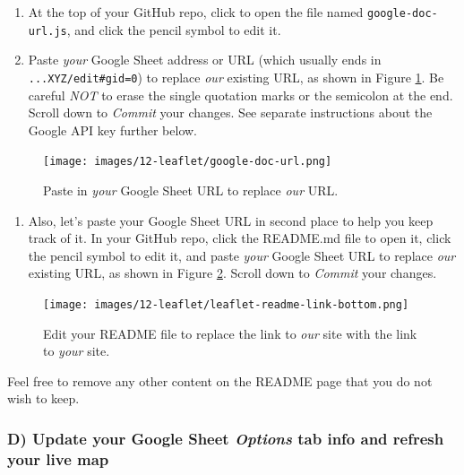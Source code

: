 \documentclass[
  english,
]{book}
\providecommand{\tightlist}{%
  \setlength{\itemsep}{0pt}\setlength{\parskip}{0pt}}
\begin{document}
\begin{enumerate}
\def\labelenumi{\arabic{enumi}.}
\item
  At the top of your GitHub repo, click to open the file named \texttt{google-doc-url.js}, and click the pencil symbol to edit it.
\item
  Paste \emph{your} Google Sheet address or URL (which usually ends in \texttt{...XYZ/edit\#gid=0}) to replace \emph{our} existing URL, as shown in Figure \ref{fig:google-doc-url}. Be careful \emph{NOT} to erase the single quotation marks or the semicolon at the end. Scroll down to \emph{Commit} your changes. See separate instructions about the Google API key further below.
\end{enumerate}



\begin{figure}
\centering
\texttt{[image: images/12-leaflet/google-doc-url.png]}
\caption{\label{fig:google-doc-url}Paste in \emph{your} Google Sheet URL to replace \emph{our} URL.}
\end{figure}

\begin{enumerate}
\def\labelenumi{\arabic{enumi}.}
\setcounter{enumi}{2}
\tightlist
\item
  Also, let's paste your Google Sheet URL in second place to help you keep track of it. In your GitHub repo, click the README.md file to open it, click the pencil symbol to edit it, and paste \emph{your} Google Sheet URL to replace \emph{our} existing URL, as shown in Figure \ref{fig:leaflet-readme-link-bottom}. Scroll down to \emph{Commit} your changes.
\end{enumerate}



\begin{figure}
\centering
\texttt{[image: images/12-leaflet/leaflet-readme-link-bottom.png]}
\caption{\label{fig:leaflet-readme-link-bottom}Edit your README file to replace the link to \emph{our} site with the link to \emph{your} site.}
\end{figure}

Feel free to remove any other content on the README page that you do not wish to keep.

\hypertarget{d-update-your-google-sheet-options-tab-info-and-refresh-your-live-map}{%
\subsubsection*{\texorpdfstring{D) Update your Google Sheet \emph{Options} tab info and refresh your live map}{D) Update your Google Sheet Options tab info and refresh your live map}}\label{d-update-your-google-sheet-options-tab-info-and-refresh-your-live-map}}
\end{document}
